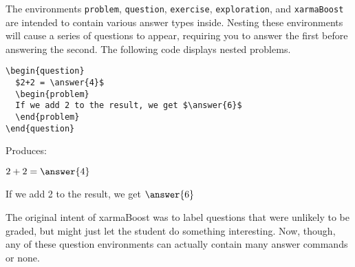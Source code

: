 \documentclass{ximera}
\begin{document}
\begin{example}
The environments \verb!problem!, \verb!question!, \verb!exercise!, \verb!exploration!, and \verb!xarmaBoost! are intended to contain various answer types inside. Nesting these environments will cause a series of questions to appear, requiring you to answer the first before answering the second. The following code displays nested problems.

\begin{verbatim}
\begin{question}
  $2+2 = \answer{4}$
  \begin{problem}
  If we add 2 to the result, we get $\answer{6}$
  \end{problem}
\end{question}
\end{verbatim}

Produces:

\begin{question}
  $2+2 = \answer{4}$
  \begin{problem}
  If we add 2 to the result, we get $\answer{6}$
  \end{problem}
\end{question}

\begin{remark} 
The original intent of xarmaBoost was to label questions that were unlikely to be graded, but might just let the student do something interesting. Now, though, any of these question environments can actually contain many answer commands or none.
\end{remark}
\end{example}
\end{document}
